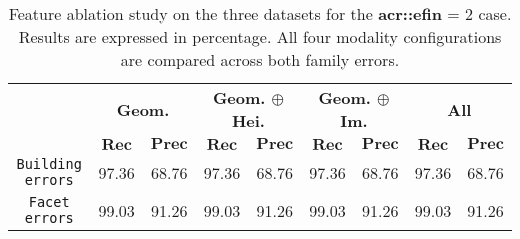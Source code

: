 \begin{table}[htbp]
\begin{tabular}{|c | c c | c c | c c | c c |}
                \hline
                & \multicolumn{2}{c|}{\textbf{Geom.}} & \multicolumn{2}{c|}{\textbf{Geom. \(\oplus\) Hei.}} & \multicolumn{2}{c|}{\textbf{Geom. \(\oplus\) Im.}} & \multicolumn{2}{x{1.8cm}|}{\textbf{All}}\\
                \cline{2-9}
                & \(\bm{Rec}\) & \(\bm{Prec}\) &  \(\bm{Rec}\) & \(\bm{Prec}\) &  \(\bm{Rec}\) & \(\bm{Prec}\) &  \(\bm{Rec}\) & \(\bm{Prec}\) \\
                \hline
                \texttt{Building errors} & 97.36 & 68.76 & 97.36 & 68.76 & 97.36 & 68.76 & 97.36 & 68.76 \\
                \hline
                \texttt{Facet errors} & 99.03 & 91.26 & 99.03 & 91.26 & 99.03 & 91.26 & 99.03 & 91.26 \\
                \hline
            \end{tabular}
            \caption{
                \label{tab::ablation_f2}
                Feature ablation study on the three datasets for the \textbf{\gls{acr::efin}} = 2 case.
                Results are expressed in percentage.
                All four modality configurations are compared across both family errors.
            }
        \end{table}
    
